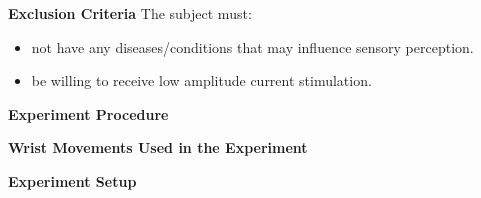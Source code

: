 \textbf{Exclusion Criteria}
The subject must:
\begin{itemize}
	\item not have any diseases/conditions that may influence sensory perception.
	\item be willing to receive low amplitude current stimulation. 
\end{itemize}


\textbf{{\Large Experiment Procedure}}

\textbf{{\Large Wrist Movements Used in the Experiment}}

\textbf{{\Large Experiment Setup}}

